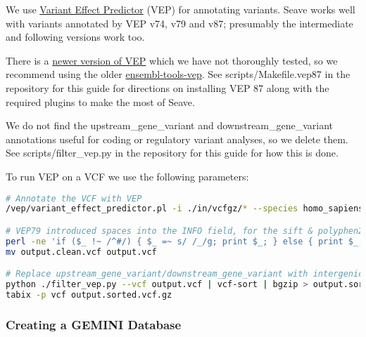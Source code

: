 \documentclass[11pt, a4paper]{article}
\begin{document}
We use \href{https://asia.ensembl.org/info/docs/tools/vep/script/vep_download.html}{Variant Effect Predictor} (VEP) for annotating variants. Seave works well with variants annotated by VEP v74, v79 and v87; presumably the intermediate and following versions work too.

There is a \href{https://github.com/Ensembl/ensembl-vep}{newer version of VEP} which we have not thoroughly tested, so we recommend using the older \href{https://asia.ensembl.org/info/docs/tools/vep/script/vep_download.html}{ensembl-tools-vep}. See scripts/Makefile.vep87 in the repository for this guide for directions on installing VEP 87 along with the required plugins to make the most of Seave.

We do not find the upstream\_gene\_variant and downstream\_gene\_variant annotations useful for coding or regulatory variant analyses, so we delete them. See scripts/filter\_vep.py in the repository for this guide for how this is done.

To run VEP on a VCF we use the following parameters:

\begin{lstlisting}[language=bash]
# Annotate the VCF with VEP
/vep/variant_effect_predictor.pl -i ./in/vcfgz/* --species homo_sapiens --vcf -o output.vcf --stats_file "$vcfgz_prefix".vep.html --offline --fork `nproc` --no_progress --canonical --polyphen b --sift b --symbol --numbers --terms so --biotype --total_length --plugin LoF,human_ancestor_fa:false --fields Consequence,Codons,Amino_acids,Gene,SYMBOL,Feature,EXON,PolyPhen,SIFT,Protein_position,BIOTYPE,CANONICAL,Feature_type,cDNA_position,CDS_position,Existing_variation,DISTANCE,STRAND,CLIN_SIG,LoF_flags,LoF_filter,LoF,RadialSVM_score,RadialSVM_pred,LR_score,LR_pred,CADD_raw,CADD_phred,Reliability_index,HGVSc,HGVSp --fasta /vep/homo_sapiens/87_GRCh37/Homo_sapiens.GRCh37.75.dna.primary_assembly.fa.gz --hgvs --shift_hgvs 1 --dir /vep

# VEP79 introduced spaces into the INFO field, for the sift & polyphen2 annotations. fix them.
perl -ne 'if ($_ !~ /^#/) { $_ =~ s/ /_/g; print $_; } else { print $_; }' output.vcf > output.clean.vcf
mv output.clean.vcf output.vcf

# Replace upstream_gene_variant/downstream_gene_variant with intergenic_variant
python ./filter_vep.py --vcf output.vcf | vcf-sort | bgzip > output.sorted.vcf.gz
tabix -p vcf output.sorted.vcf.gz
\end{lstlisting}

\subsubsection{Creating a GEMINI Database}
\end{document}
